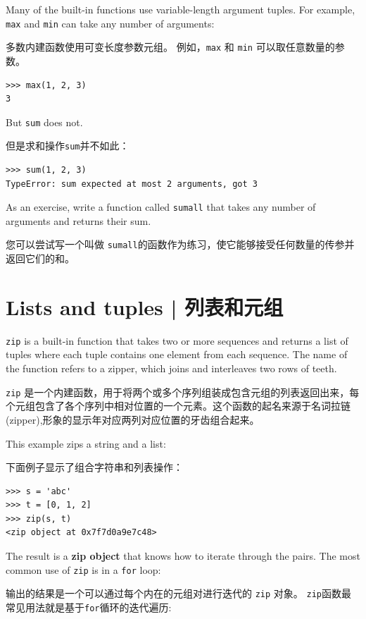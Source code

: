 %
Many of the built-in functions use
variable-length argument tuples.  For example, {\tt max}
and {\tt min} can take any number of arguments:

多数内建函数使用可变长度参数元组。 例如，\lstinline{max} 和 \lstinline{min} 可以取任意数量的参数。

 
 

\begin{lstlisting}
>>> max(1, 2, 3)
3
\end{lstlisting}
%
But {\tt sum} does not.

但是求和操作\lstinline{sum}并不如此：
 

\begin{lstlisting}
>>> sum(1, 2, 3)
TypeError: sum expected at most 2 arguments, got 3
\end{lstlisting}
%
As an exercise, write a function called {\tt sumall} that takes any number
of arguments and returns their sum.

您可以尝试写一个叫做 \lstinline{sumall}的函数作为练习，使它能够接受任何数量的传参并返回它们的和。

\section{Lists and tuples | 列表和元组}
 

{\tt zip} is a built-in function that takes two or more sequences and
returns a list of tuples where each tuple contains one
element from each sequence.  The name of the function refers to
a zipper, which joins and interleaves two rows of teeth.

\lstinline{zip} 是一个内建函数，用于将两个或多个序列组装成包含元组的列表返回出来，每个元组包含了各个序列中相对位置的一个元素。这个函数的起名来源于名词拉链(zipper),形象的显示年对应两列对应位置的牙齿组合起来。

This example zips a string and a list:

下面例子显示了组合字符串和列表操作：

\begin{lstlisting}
>>> s = 'abc'
>>> t = [0, 1, 2]
>>> zip(s, t)
<zip object at 0x7f7d0a9e7c48>
\end{lstlisting}
%
The result is a {\bf zip object} that knows how to iterate through
the pairs.  The most common use of {\tt zip} is in a {\tt for} loop:

输出的结果是一个可以通过每个内在的元组对进行迭代的 \lstinline{zip} 对象。 \lstinline{zip}函数最常见用法就是基于\lstinline{for}循环的迭代遍历:

